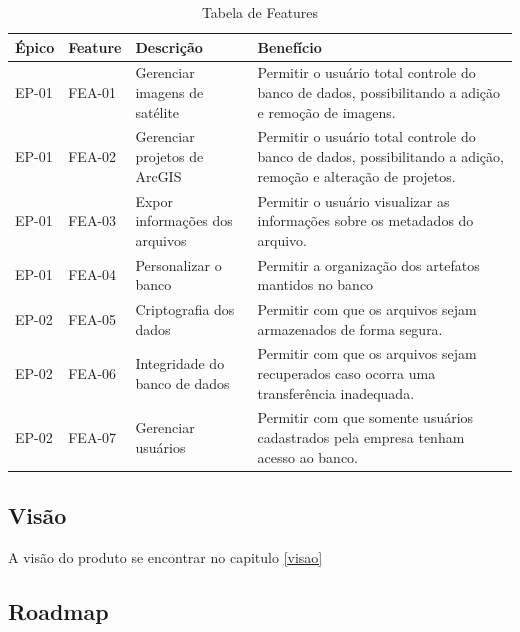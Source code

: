   \begin{table}[!htb]
    \centering
    \begin{tabular}{llp{3cm}p{8cm}} \hline
      \rowcolor{gray!50}
      \textbf{Épico} & \textbf{Feature} & \textbf{Descrição} & \textbf{Benefício}                                                     \\ \hline
      EP-01 & FEA-01 & Gerenciar imagens de satélite  & Permitir o usuário total controle do banco de dados, possibilitando a adição
                                                        e remoção de imagens.                                                         \\
      EP-01 & FEA-02 & Gerenciar projetos de ArcGIS   & Permitir o usuário total controle do banco de dados, possibilitando a adição,
                                                        remoção e alteração de projetos.                                              \\
      EP-01 & FEA-03 & Expor informações dos arquivos & Permitir o usuário visualizar as informações sobre os metadados do arquivo.   \\
      EP-01 & FEA-04 & Personalizar o banco           & Permitir a organização dos artefatos mantidos no banco                        \\
      EP-02 & FEA-05 & Criptografia dos dados         & Permitir com que os arquivos sejam armazenados de forma segura.               \\
      EP-02 & FEA-06 & Integridade do banco de dados  & Permitir com que os arquivos sejam recuperados caso ocorra uma transferência
                                                        inadequada.                                                                   \\
      EP-02 & FEA-07 & Gerenciar usuários             & Permitir com que somente usuários cadastrados pela empresa tenham acesso ao
                                                        banco.
    \end{tabular}
    \caption{Tabela de Features}
  \end{table}


\subsection{Visão}

  A visão do produto se encontrar no capitulo \ref{visao}

\subsection{Roadmap}

